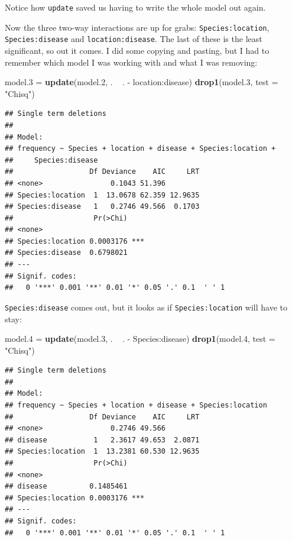 \documentclass[]{tufte-book}
\newenvironment{Shaded}{}{}
\newcommand{\DataTypeTok}[1]{\textcolor[rgb]{0.56,0.13,0.00}{#1}}
\newcommand{\FloatTok}[1]{\textcolor[rgb]{0.25,0.63,0.44}{#1}}
\newcommand{\KeywordTok}[1]{\textcolor[rgb]{0.00,0.44,0.13}{\textbf{#1}}}
\newcommand{\NormalTok}[1]{#1}
\newcommand{\OperatorTok}[1]{\textcolor[rgb]{0.40,0.40,0.40}{#1}}
\newcommand{\StringTok}[1]{\textcolor[rgb]{0.25,0.44,0.63}{#1}}
\theoremstyle{definition}
\theoremstyle{definition}
\theoremstyle{definition}
\theoremstyle{remark}
\begin{document}
Notice how \texttt{update} saved us having to write the whole model out
again.

Now the three two-way interactions are up for grabs:
\texttt{Species:location}, \texttt{Species:disease} and
\texttt{location:disease}. The last of these is the least significant,
so out it comes. I did some copying and pasting, but I had to remember
which model I was working with and what I was removing:

\begin{Shaded}
\begin{Highlighting}[]
\NormalTok{model}\FloatTok{.3}\NormalTok{ =}\StringTok{ }\KeywordTok{update}\NormalTok{(model}\FloatTok{.2}\NormalTok{, . }\OperatorTok{~}\StringTok{ }\NormalTok{. }\OperatorTok{-}\StringTok{ }\NormalTok{location}\OperatorTok{:}\NormalTok{disease)}
\KeywordTok{drop1}\NormalTok{(model}\FloatTok{.3}\NormalTok{, }\DataTypeTok{test =} \StringTok{"Chisq"}\NormalTok{)}
\end{Highlighting}
\end{Shaded}

\begin{verbatim}
## Single term deletions
## 
## Model:
## frequency ~ Species + location + disease + Species:location + 
##     Species:disease
##                  Df Deviance    AIC     LRT
## <none>                0.1043 51.396        
## Species:location  1  13.0678 62.359 12.9635
## Species:disease   1   0.2746 49.566  0.1703
##                   Pr(>Chi)    
## <none>                        
## Species:location 0.0003176 ***
## Species:disease  0.6798021    
## ---
## Signif. codes:  
##   0 '***' 0.001 '**' 0.01 '*' 0.05 '.' 0.1  ' ' 1
\end{verbatim}

\texttt{Species:disease} comes out, but it looks as if
\texttt{Species:location} will have to stay:

\begin{Shaded}
\begin{Highlighting}[]
\NormalTok{model}\FloatTok{.4}\NormalTok{ =}\StringTok{ }\KeywordTok{update}\NormalTok{(model}\FloatTok{.3}\NormalTok{, . }\OperatorTok{~}\StringTok{ }\NormalTok{. }\OperatorTok{-}\StringTok{ }\NormalTok{Species}\OperatorTok{:}\NormalTok{disease)}
\KeywordTok{drop1}\NormalTok{(model}\FloatTok{.4}\NormalTok{, }\DataTypeTok{test =} \StringTok{"Chisq"}\NormalTok{)}
\end{Highlighting}
\end{Shaded}

\begin{verbatim}
## Single term deletions
## 
## Model:
## frequency ~ Species + location + disease + Species:location
##                  Df Deviance    AIC     LRT
## <none>                0.2746 49.566        
## disease           1   2.3617 49.653  2.0871
## Species:location  1  13.2381 60.530 12.9635
##                   Pr(>Chi)    
## <none>                        
## disease          0.1485461    
## Species:location 0.0003176 ***
## ---
## Signif. codes:  
##   0 '***' 0.001 '**' 0.01 '*' 0.05 '.' 0.1  ' ' 1
\end{verbatim}
\end{document}
